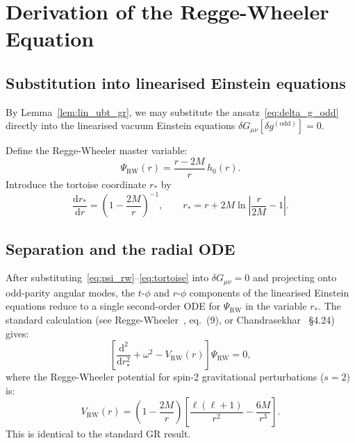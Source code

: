 \documentclass[12pt,a4paper]{article}
\theoremstyle{definition}
\theoremstyle{remark}
\newcommand{\dd}{\mathrm{d}}
\begin{document}
\section{Derivation of the Regge-Wheeler Equation}
\label{sec:rw_derivation}

\subsection{Substitution into linearised Einstein equations}

By Lemma~\ref{lem:lin_ubt_gr}, we may substitute the ansatz~\eqref{eq:delta_g_odd}
directly into the linearised vacuum Einstein equations
$\delta G_{\mu\nu}[\delta g^{(\mathrm{odd})}] = 0$.

Define the Regge-Wheeler master variable:
\begin{equation}
\label{eq:psi_rw}
  \Psi_{\mathrm{RW}}(r) = \frac{r-2M}{r}\,h_0(r).
\end{equation}
Introduce the tortoise coordinate $r_*$ by
\begin{equation}
\label{eq:tortoise}
  \frac{\dd r_*}{\dd r} = \left(1-\frac{2M}{r}\right)^{-1},
  \qquad
  r_* = r + 2M\ln\left|\frac{r}{2M}-1\right|.
\end{equation}

\subsection{Separation and the radial ODE}

After substituting~\eqref{eq:psi_rw}--\eqref{eq:tortoise} into
$\delta G_{\mu\nu} = 0$ and projecting onto odd-parity angular modes, the
$t$-$\phi$ and $r$-$\phi$ components of the linearised Einstein equations
reduce to a single second-order ODE for $\Psi_{\mathrm{RW}}$ in the variable
$r_*$.  The standard calculation (see Regge-Wheeler~\cite{regge_wheeler1957},
eq.~(9), or Chandrasekhar~\cite{chandrasekhar1983} §4.24) gives:
\begin{equation}
\label{eq:rw_ode}
  \left[\frac{\dd^2}{\dd r_*^2} + \omega^2
        - V_{\mathrm{RW}}(r)\right]\Psi_{\mathrm{RW}} = 0,
\end{equation}
where the Regge-Wheeler potential for spin-2 gravitational perturbations ($s=2$)
is:
\begin{equation}
\label{eq:V_rw}
  V_{\mathrm{RW}}(r)
  = \left(1-\frac{2M}{r}\right)
    \left[\frac{\ell(\ell+1)}{r^2} - \frac{6M}{r^3}\right].
\end{equation}
This is identical to the standard GR result.
\end{document}
